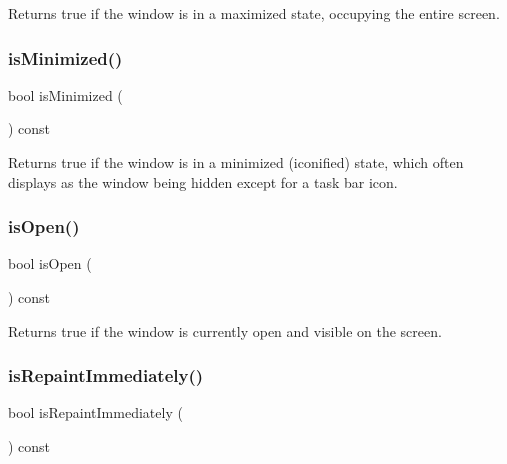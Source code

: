 Returns true if the window is in a maximized state, occupying the entire screen. 

\mbox{\label{classGWindow_a14e6f95fa2c9ec543caa7f16f30c53d6}} 
\subsubsection{\texorpdfstring{is\+Minimized()}{isMinimized()}}
{\footnotesize\ttfamily bool is\+Minimized (\begin{DoxyParamCaption}{ }\end{DoxyParamCaption}) const\hspace{0.3cm}{\ttfamily [virtual]}}



Returns true if the window is in a minimized (iconified) state, which often displays as the window being hidden except for a task bar icon. 

\mbox{\label{classGWindow_a002ed331862370f434b7befe331b5a0b}} 
\subsubsection{\texorpdfstring{is\+Open()}{isOpen()}}
{\footnotesize\ttfamily bool is\+Open (\begin{DoxyParamCaption}{ }\end{DoxyParamCaption}) const\hspace{0.3cm}{\ttfamily [virtual]}}



Returns true if the window is currently open and visible on the screen. 

\mbox{\label{classGWindow_ae88344ee919d3d3de6e38a8381faf209}} 
\subsubsection{\texorpdfstring{is\+Repaint\+Immediately()}{isRepaintImmediately()}}
{\footnotesize\ttfamily bool is\+Repaint\+Immediately (\begin{DoxyParamCaption}{ }\end{DoxyParamCaption}) const\hspace{0.3cm}{\ttfamily [virtual]}}



